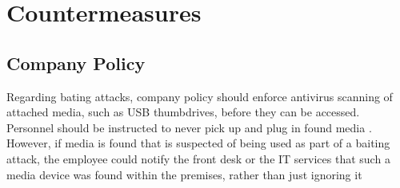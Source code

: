 



\chapter{Countermeasures\label{countermeasures}}


\section{Company Policy}

Regarding bating attacks, company policy should enforce antivirus scanning of attached media, such as USB thumbdrives, before they can be accessed. Personnel should be instructed to never pick up and plug in found media \citep{salahdine_social_2019}. However, if media is found that is suspected of being used as part of a baiting attack, the employee could notify the front desk or the IT services that such a media device was found within the premises, rather than just ignoring it 
